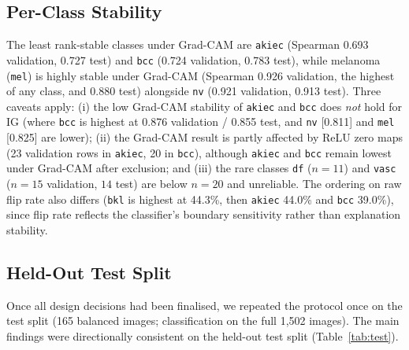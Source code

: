 \documentclass[conference]{IEEEtran}
\begin{document}
\subsection{Per-Class Stability}
The least rank-stable classes under Grad-CAM are \texttt{akiec} (Spearman
0.693 validation, 0.727 test) and \texttt{bcc} (0.724 validation, 0.783 test),
while melanoma (\texttt{mel}) is highly stable under Grad-CAM (Spearman
0.926 validation, the highest of any class, and 0.880 test) alongside
\texttt{nv} (0.921 validation, 0.913 test). Three caveats apply: (i) the low
Grad-CAM stability of \texttt{akiec} and \texttt{bcc} does \emph{not} hold
for IG (where \texttt{bcc} is highest at 0.876 validation / 0.855 test, and
\texttt{nv} [0.811] and \texttt{mel} [0.825] are lower); (ii) the Grad-CAM
result is partly affected by ReLU zero maps (23 validation rows in
\texttt{akiec}, 20 in \texttt{bcc}), although \texttt{akiec} and \texttt{bcc}
remain lowest under Grad-CAM after exclusion; and (iii) the rare classes
\texttt{df} ($n{=}11$) and \texttt{vasc} ($n{=}15$ validation, $14$ test) are
below $n{=}20$ and unreliable. The ordering on raw flip rate also differs
(\texttt{bkl} is highest at 44.3\%, then \texttt{akiec} 44.0\% and
\texttt{bcc} 39.0\%), since flip rate reflects the classifier's boundary
sensitivity rather than explanation stability.

\subsection{Held-Out Test Split}
Once all design decisions had been finalised, we repeated the protocol once
on the test split (165 balanced images; classification on the full 1,502
images). The main findings were directionally consistent on the held-out
test split (Table~\ref{tab:test}).
\end{document}
